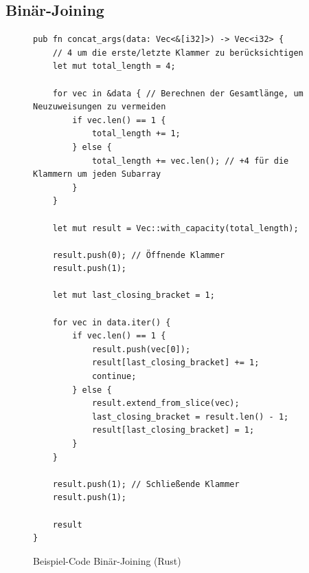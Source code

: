 \documentclass[ngerman]{article}
\begin{document}
\subsection{Binär-Joining}
\label{sec:code_nested_joining}
\begin{figure}[htbp]
  \begin{code}
    \begin{verbatim}
pub fn concat_args(data: Vec<&[i32]>) -> Vec<i32> {
    // 4 um die erste/letzte Klammer zu berücksichtigen
    let mut total_length = 4; 

    for vec in &data { // Berechnen der Gesamtlänge, um Neuzuweisungen zu vermeiden
        if vec.len() == 1 {
            total_length += 1;
        } else {
            total_length += vec.len(); // +4 für die Klammern um jeden Subarray
        }
    }

    let mut result = Vec::with_capacity(total_length);

    result.push(0); // Öffnende Klammer
    result.push(1);

    let mut last_closing_bracket = 1;

    for vec in data.iter() {
        if vec.len() == 1 {
            result.push(vec[0]);
            result[last_closing_bracket] += 1;
            continue;
        } else {
            result.extend_from_slice(vec);
            last_closing_bracket = result.len() - 1;
            result[last_closing_bracket] = 1;
        }
    }

    result.push(1); // Schließende Klammer
    result.push(1);

    result
}

    \end{verbatim}
  \end{code}

  \caption{Beispiel-Code Binär-Joining (Rust)}

\end{figure}

\pagebreak
\end{document}
